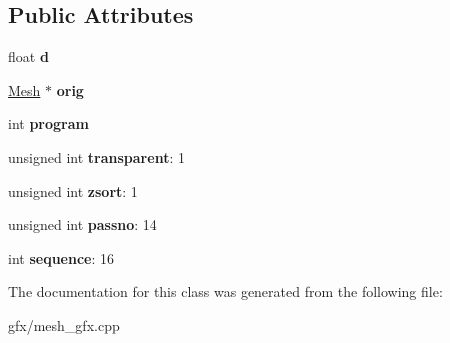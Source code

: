 \subsection*{Public Attributes}
\begin{DoxyCompactItemize}
\item 
float {\bfseries d}\hypertarget{classOrigMeshContainer_aa6fa4a8f8a8d969f3395d5629dc56d48}{}\label{classOrigMeshContainer_aa6fa4a8f8a8d969f3395d5629dc56d48}

\item 
\hyperlink{classMesh}{Mesh} $\ast$ {\bfseries orig}\hypertarget{classOrigMeshContainer_a1f2228edcdc74adb1c9706b73c26306a}{}\label{classOrigMeshContainer_a1f2228edcdc74adb1c9706b73c26306a}

\item 
int {\bfseries program}\hypertarget{classOrigMeshContainer_a3677846b9ebf2a1446082315348bfa07}{}\label{classOrigMeshContainer_a3677846b9ebf2a1446082315348bfa07}

\item 
unsigned int {\bfseries transparent}\+: 1\hypertarget{classOrigMeshContainer_a1b249367ac4d2f1dc307c03e53f40d7e}{}\label{classOrigMeshContainer_a1b249367ac4d2f1dc307c03e53f40d7e}

\item 
unsigned int {\bfseries zsort}\+: 1\hypertarget{classOrigMeshContainer_a4108e047ac358c459797477dea10f8e4}{}\label{classOrigMeshContainer_a4108e047ac358c459797477dea10f8e4}

\item 
unsigned int {\bfseries passno}\+: 14\hypertarget{classOrigMeshContainer_afa2ea73b298d85a3f49a9c4de14fa38a}{}\label{classOrigMeshContainer_afa2ea73b298d85a3f49a9c4de14fa38a}

\item 
int {\bfseries sequence}\+: 16\hypertarget{classOrigMeshContainer_a204fc8c97c205cc659348c1ee0699022}{}\label{classOrigMeshContainer_a204fc8c97c205cc659348c1ee0699022}

\end{DoxyCompactItemize}


The documentation for this class was generated from the following file\+:\begin{DoxyCompactItemize}
\item 
gfx/mesh\+\_\+gfx.\+cpp\end{DoxyCompactItemize}
